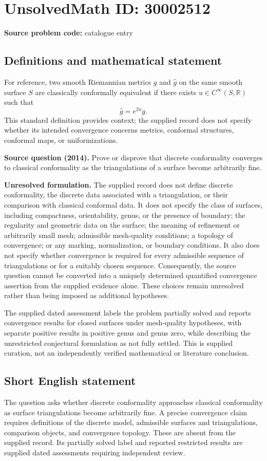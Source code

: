\documentclass[11pt]{article}
\newcommand{\R}{\mathbb{R}}
\begin{document}
\section*{UnsolvedMath ID: 30002512}
\textbf{Source problem code:} catalogue entry
\subsection{Definitions and mathematical statement}
For reference, two smooth Riemannian metrics \(g\) and \(\widehat g\) on the same smooth surface \(S\) are classically conformally equivalent if there exists \(u\in C^\infty(S,\R)\) such that
\[
\widehat g=e^{2u}g.
\]
This standard definition provides context; the supplied record does not specify whether its intended convergence concerns metrics, conformal structures, conformal maps, or uniformizations.

\textbf{Source question (2014).} Prove or disprove that discrete conformality converges to classical conformality as the triangulations of a surface become arbitrarily fine.

\textbf{Unresolved formulation.} The supplied record does not define discrete conformality, the discrete data associated with a triangulation, or their comparison with classical conformal data. It does not specify the class of surfaces, including compactness, orientability, genus, or the presence of boundary; the regularity and geometric data on the surface; the meaning of refinement or arbitrarily small mesh; admissible mesh-quality conditions; a topology of convergence; or any marking, normalization, or boundary conditions. It also does not specify whether convergence is required for every admissible sequence of triangulations or for a suitably chosen sequence. Consequently, the source question cannot be converted into a uniquely determined quantified convergence assertion from the supplied evidence alone. These choices remain unresolved rather than being imposed as additional hypotheses.

The supplied dated assessment labels the problem partially solved and reports convergence results for closed surfaces under mesh-quality hypotheses, with separate positive results in positive genus and genus zero, while describing the unrestricted conjectural formulation as not fully settled. This is supplied curation, not an independently verified mathematical or literature conclusion.
\subsection{Short English statement}
The question asks whether discrete conformality approaches classical conformality as surface triangulations become arbitrarily fine. A precise convergence claim requires definitions of the discrete model, admissible surfaces and triangulations, comparison objects, and convergence topology. These are absent from the supplied record. Its partially solved label and reported restricted results are supplied dated assessments requiring independent review.
\end{document}

